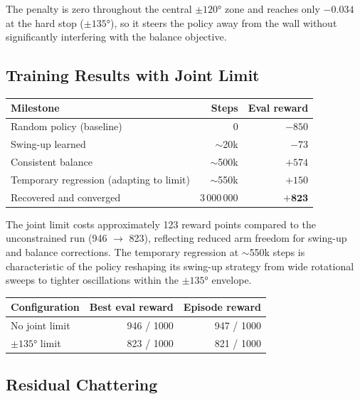\documentclass[12pt,a4paper]{article}
\begin{document}
\noindent The penalty is zero throughout the central $\pm120°$ zone and reaches
only $-0.034$ at the hard stop ($\pm135°$), so it steers the policy away from
the wall without significantly interfering with the balance objective.

\subsection{Training Results with Joint Limit}

\begin{center}
\begin{tabular}{lrr}
\toprule
\textbf{Milestone} & \textbf{Steps} & \textbf{Eval reward} \\
\midrule
Random policy (baseline)  & 0            & $-850$ \\
Swing-up learned          & $\sim$20k    & $-73$  \\
Consistent balance        & $\sim$500k   & $+574$ \\
Temporary regression (adapting to limit) & $\sim$550k & $+150$ \\
Recovered and converged   & 3\,000\,000  & $\mathbf{+823}$ \\
\bottomrule
\end{tabular}
\end{center}

\noindent The joint limit costs approximately 123 reward points compared to the
unconstrained run (946 $\rightarrow$ 823), reflecting reduced arm freedom for
swing-up and balance corrections. The temporary regression at $\sim$550k steps
is characteristic of the policy reshaping its swing-up strategy from wide
rotational sweeps to tighter oscillations within the $\pm135°$ envelope.

\begin{center}
\begin{tabular}{lrr}
\toprule
\textbf{Configuration} & \textbf{Best eval reward} & \textbf{Episode reward} \\
\midrule
No joint limit  & 946 / 1000 & 947 / 1000 \\
$\pm135°$ limit & 823 / 1000 & 821 / 1000 \\
\bottomrule
\end{tabular}
\end{center}

\subsection{Residual Chattering}
\end{document}
